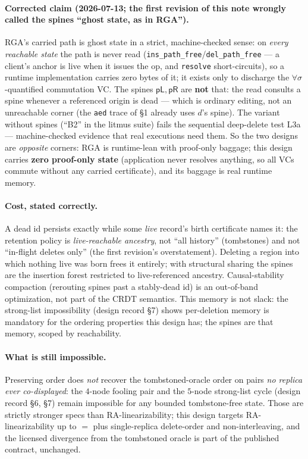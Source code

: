 \documentclass[11pt]{article}
\newcommand{\pL}{\mathsf{pL}}
\newcommand{\pR}{\mathsf{pR}}
\begin{document}
\paragraph{Corrected claim (2026-07-13; the first revision of this note wrongly
called the spines ``ghost state, as in RGA'').} RGA's carried path is ghost
state in a strict, machine-checked sense: on \emph{every reachable state} the
path is never read (\texttt{ins\_path\_free}/\texttt{del\_path\_free} --- a
client's anchor is live when it issues the op, and \texttt{resolve}
short-circuits), so a runtime implementation carries zero bytes of it; it exists
only to discharge the $\forall\sigma$-quantified commutation VC. The spines
$\pL,\pR$ are \textbf{not} that: the read consults a spine whenever a referenced
origin is dead --- which is ordinary editing, not an unreachable corner (the
\texttt{aed} trace of \S1 already uses $d$'s spine). The variant without spines
(``B2'' in the litmus suite) fails the sequential deep-delete test L3a ---
machine-checked evidence that real executions need them. So the two designs are
\emph{opposite} corners: RGA is runtime-lean with proof-only baggage; this
design carries \textbf{zero proof-only state} (application never resolves
anything, so all VCs commute without any carried certificate), and its baggage
is real runtime memory.

\paragraph{Cost, stated correctly.} A dead id persists exactly while some
\emph{live} record's birth certificate names it: the retention policy is
\emph{live-reachable ancestry}, not ``all history'' (tombstones) and not
``in-flight deletes only'' (the first revision's overstatement). Deleting a
region into which nothing live was born frees it entirely; with structural
sharing the spines are the insertion forest restricted to live-referenced
ancestry. Causal-stability compaction (rerouting spines past a stably-dead id)
is an out-of-band optimization, not part of the CRDT semantics. This memory is
not slack: the strong-list impossibility (design record \S7\textonehalf) shows
per-deletion memory is mandatory for the ordering properties this design has;
the spines are that memory, scoped by reachability.

\paragraph{What is still impossible.} Preserving order does \emph{not} recover the
tombstoned-oracle order on pairs \emph{no replica ever co-displayed}: the
$4$-node fooling pair and the $5$-node strong-list cycle (design record \S6,
\S7\textonehalf) remain impossible for any bounded tombstone-free state. Those
are strictly stronger specs than RA-linearizability; this design targets
RA-linearizability up to $=$ plus single-replica delete-order and
non-interleaving, and the licensed divergence from the tombstoned oracle is part
of the published contract, unchanged.
\end{document}
